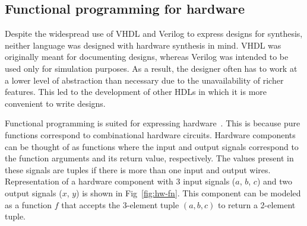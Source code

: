 
\subsection{Functional programming for hardware}

Despite the widespread use of VHDL and Verilog to express designs for
synthesis, neither language was designed with hardware synthesis in
mind.
VHDL was originally meant for documenting designs, whereas Verilog was
intended to be used only for simulation purposes.
%
As a result, the designer often has to work at a lower level of
abstraction than necessary due to the unavailability of richer features.
%
This led to the development of other \glspl{HDL} in which it is more
convenient to write designs.
%


Functional programming is suited for expressing
hardware~\cite{elliott2017compiling}.
This is because pure functions correspond to combinational hardware
circuits.
Hardware components can be thought of as functions where the input and
output signals correspond to the function arguments and its return
value, respectively.
%
The values present in these signals are tuples if there is more than
one input and output wires.
Representation of a hardware component with 3 input signals ($a$, $b$,
$c$) and two output signals ($x$, $y$) is shown in
Fig~\ref{fig:hw-fn}.
This component can be modeled as a function $f$ that accepts the
3-element tuple $(a, b, c)$ to return a 2-element tuple.

